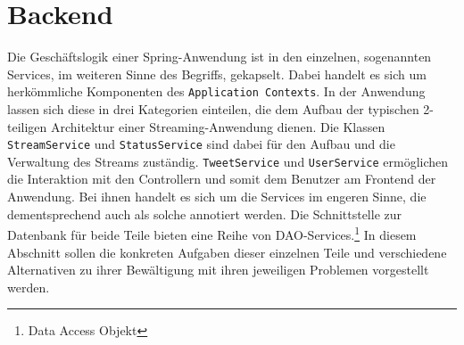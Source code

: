 \section{Backend}

Die Geschäftslogik einer Spring-Anwendung ist in den einzelnen, sogenannten Services, im 
weiteren Sinne des Begriffs, gekapselt. Dabei handelt es sich um herkömmliche Komponenten des 
\texttt{Application Contexts}. In der Anwendung lassen sich diese in drei Kategorien einteilen, 
die dem Aufbau der typischen 2-teiligen Architektur einer Streaming-Anwendung dienen. Die 
Klassen \texttt{StreamService} und \texttt{StatusService} sind dabei für den Aufbau und die 
Verwaltung des Streams zuständig. \texttt{TweetService} und \texttt{UserService} ermöglichen die 
Interaktion mit den Controllern und somit dem Benutzer am Frontend der Anwendung. Bei ihnen 
handelt es sich um die Services im engeren Sinne, die dementsprechend auch als solche annotiert 
werden. Die Schnittstelle zur Datenbank für beide Teile bieten eine Reihe von DAO-Services.\footnote{Data Access Objekt} 
In  diesem Abschnitt sollen die konkreten Aufgaben dieser einzelnen Teile und verschiedene Alternativen zu 
ihrer Bewältigung mit ihren jeweiligen 
Problemen vorgestellt werden.


